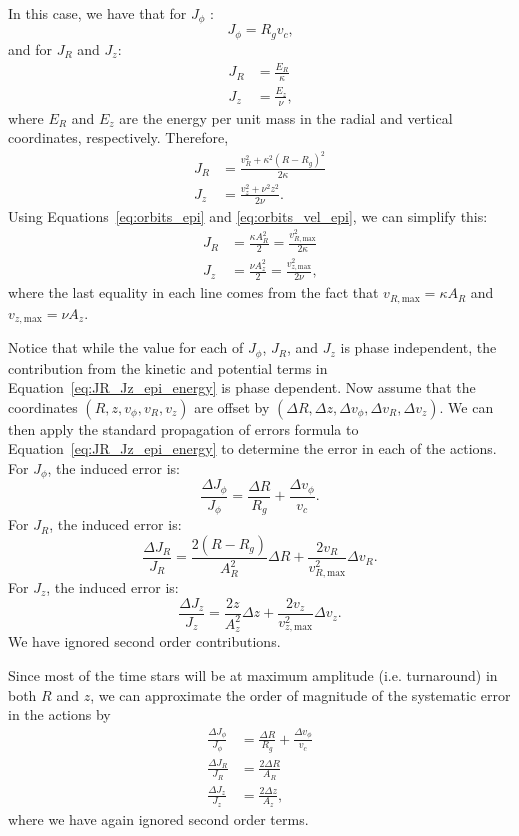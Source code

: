 \documentclass[twocolumn]{aastex62}
\newcommand{\beq}{\begin{equation}}
\newcommand{\eeq}{\end{equation}}
\begin{document}
In this case, we have that for $J_{\phi}$
\citep[][Section~3.5.3b]{2008gady.book.....B}:
\beq\label{eq:Jphi_epi}
J_{\phi} = R_g v_c\text{,}
\eeq
and for $J_R$ and $J_z$:
\beq\label{eq:JR_Jz_epi}
\begin{split}
J_R &= \frac{E_R}{\kappa} \\
J_z &= \frac{E_z}{\nu} \text{,}
\end{split}
\eeq
where $E_R$ and $E_z$ are the energy per unit mass in the radial and vertical
coordinates, respectively. Therefore,
\beq\label{eq:JR_Jz_epi_energy}
\begin{split}
J_R &= \frac{v_R^2 + \kappa^2 (R-R_g)^2}{2\kappa} \\
J_z &= \frac{v_z^2 + \nu^2 z^2}{2\nu}\text{.}
\end{split}
\eeq
Using Equations~\eqref{eq:orbits_epi} and \eqref{eq:orbits_vel_epi}, we can
simplify this:
\beq\label{eq:JR_Jz_epi_final}
\begin{split}
J_R &= \frac{\kappa A_R^2}{2} = \frac{v_{R,\text{max}}^2}{2\kappa} \\
J_z &= \frac{\nu A_z^2}{2} = \frac{v_{z,\text{max}}^2}{2\nu}\text{,}
\end{split}
\eeq
where the last equality in each line comes from the fact that
$v_{R,\text{max}} = \kappa A_R$ and $v_{z,\text{max}} = \nu A_z$.

Notice that while the value for each of $J_{\phi}$, $J_R$, and $J_z$ is phase
independent, the contribution from the kinetic and potential terms in
Equation~\eqref{eq:JR_Jz_epi_energy} is phase dependent. Now assume that the
coordinates $(R, z, v_{\phi}, v_R, v_z)$ are offset by $(\Delta R, \Delta z,
\Delta v_{\phi}, \Delta v_R, \Delta v_z)$. We can then apply the standard
propagation of errors formula to Equation~\eqref{eq:JR_Jz_epi_energy} to
determine the error in each of the actions. For $J_{\phi}$, the induced error
is:
\beq\label{eq:induced_Jphi}
\frac{\Delta J_{\phi}}{J_{\phi}} = \frac{\Delta R}{R_g}
                                    + \frac{\Delta v_{\phi}}{v_c}\text{.}
\eeq
For $J_R$, the induced error is:
\beq\label{eq:induced_JR}
\frac{\Delta J_R}{J_R} = \frac{2(R-R_g)}{A_R^2}\Delta R
                         + \frac{2v_R}{v_{R,\text{max}}^2} \Delta v_R \text{.}
\eeq
For $J_z$, the induced error is:
\beq\label{eq:induced_Jz}
\frac{\Delta J_z}{J_z} = \frac{2z}{A_z^2}\Delta z
                         + \frac{2v_z}{v_{z,\text{max}}^2} \Delta v_z \text{.}
\eeq
We have ignored second order contributions.

Since most of the time stars will be at maximum amplitude (i.e. turnaround) in
both $R$ and $z$, we can approximate the order of magnitude of the systematic
error in the actions by
\beq\label{eq:Ji_err_mosttime}
\begin{split}
\frac{\Delta J_{\phi}}{J_{\phi}} &= \frac{\Delta R}{R_g}
                                    + \frac{\Delta v_{\phi}}{v_c} \\
\frac{\Delta J_{R}}{J_{R}} &= \frac{2\Delta R}{A_R} \\
\frac{\Delta J_{z}}{J_{z}} &= \frac{2\Delta z}{A_z} \text{,}
\end{split}
\eeq
where we have again ignored second order terms.
\end{document}
